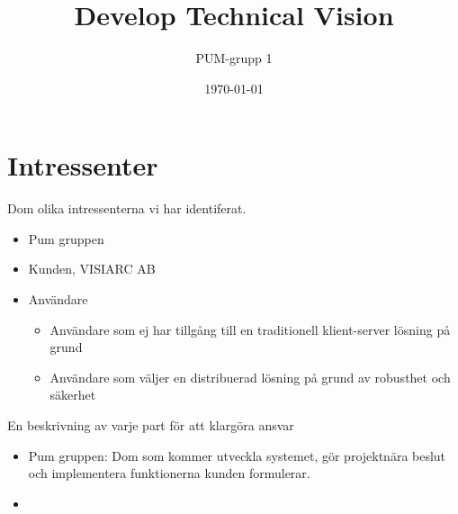 

\ifpdf
\else
\fi

\title{Develop Technical Vision}
\author{PUM-grupp 1}
\date{\today}



\maketitle\thispagestyle{empty}
\newpage
\section{Intressenter}
Dom olika intressenterna vi har identiferat.
\begin{itemize}
\item Pum gruppen
\item Kunden, VISIARC AB
\item Användare
\begin{itemize}
\item Användare som ej har tillgång till en traditionell klient-server lösning på grund
\item Användare som väljer en distribuerad lösning på grund av robusthet och säkerhet
\end{itemize}
\end{itemize}
En beskrivning av varje part för att klargöra ansvar  
\begin{itemize}
\item Pum gruppen: Dom som kommer utveckla systemet, gör projektnära beslut och implementera funktionerna kunden formulerar.\\
\item 
\end{itemize}

